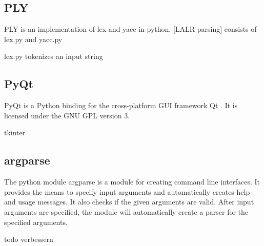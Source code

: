 \subsection{PLY}\label{sec:BackgroundPythonPLY}

\acf{PLY} \cite{PLY} is an implementation of lex and yacc in python.
[LALR-parsing]
consists of lex.py and yacc.py

lex.py tokenizes an input string\
\subsection{PyQt}\label{sec:BackgroundPytonPyQt}
PyQt is a Python binding for the cross-platform GUI framework Qt \cite{PyQt}.
It is licensed under the GNU GPL version 3.


tkinter
\subsection{argparse}\label{sec:BackgroundArgparse}
The python module argparse is a module for creating command line interfaces.
It provides the means to specify input arguments and \cite{argparse} automatically creates help and usage messages.
It also checks if the given arguments are valid.
After input arguments are specified, the module will automatically create a parser for the specified arguments.

todo verbessern